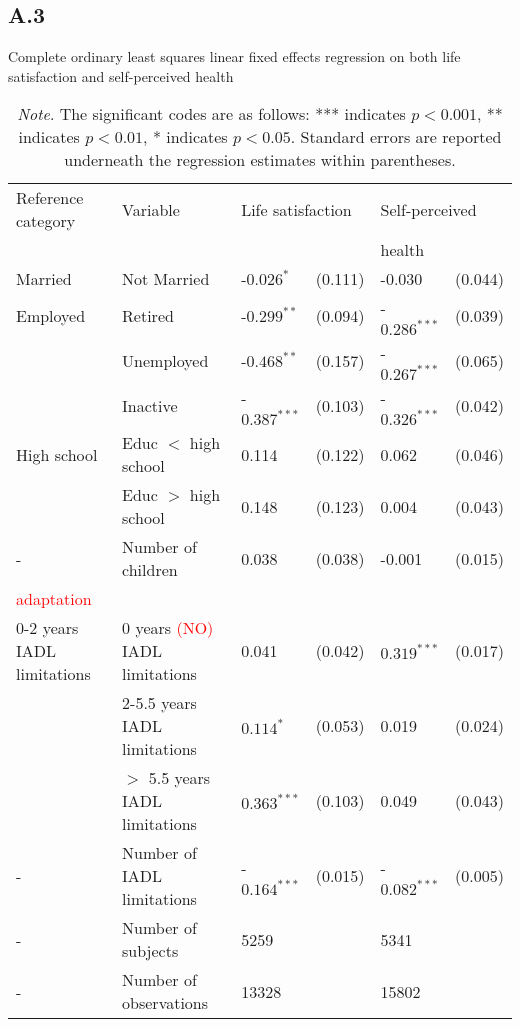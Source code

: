 \documentclass[12pt]{article}
\begin{document}
\subsection*{A.3} 
\begin{table}[htbp]
\centering
\footnotesize
\caption*{Complete ordinary least squares linear fixed effects regression on both life satisfaction and self-perceived health}
\label{table1}
\begin{tabular}{l lllll}
\hline
Reference category & Variable & \multicolumn{2}{l}{Life satisfaction} & \multicolumn{2}{l}{Self-perceived} \\
&                    &                   &  &  \multicolumn{2}{l}{health} \\\hline\hline
Married                        & Not Married                    & -$0.026^{*}$  & (0.111)   & -0.030        & (0.044)   \\
Employed                       & Retired                        & -$0.299^{**}$ & (0.094)   & -$0.286^{***}$& (0.039)   \\
                               & Unemployed                     & -$0.468^{**}$ & (0.157)   & -$0.267^{***}$& (0.065)   \\
                               & Inactive                       & -$0.387^{***}$& (0.103)   & -$0.326^{***}$& (0.042)   \\
High school                    & Educ $<$ high school           &  0.114        & (0.122)   &  0.062        & (0.046)   \\
                               & Educ $>$ high school           &  0.148        & (0.123)   &  0.004        & (0.043)   \\
-                              & Number of children             &  0.038        & (0.038)   & -0.001        & (0.015)   \\
\textcolor{red}{adaptation} &&&&\\
0-2 years IADL limitations     & 0 years \textcolor{red}{(NO)} IADL limitations  &  0.041        & (0.042)   &  $0.319^{***}$& (0.017)   \\
                               & 2-5.5 years IADL limitations   &  $0.114^{*}$  & (0.053)   &  0.019        & (0.024)   \\
                               & $>$ 5.5 years IADL limitations &  $0.363^{***}$& (0.103)   &  0.049        & (0.043)   \\
-                              & Number of IADL limitations     & -$0.164^{***}$& (0.015)   & -$0.082^{***}$& (0.005)   \\
-                              & Number of subjects             & 5259          &           & 5341          &           \\
-                              & Number of observations         & 13328         &           & 15802         &           \\
\hline
\end{tabular}
\caption*{\footnotesize{\textit{Note}. The significant codes are as follows: *** indicates $p < 0.001$, ** indicates $p < 0.01$, * indicates $p <0.05$. Standard errors are reported underneath the regression estimates within parentheses.}}
\end{table}
\end{document}

